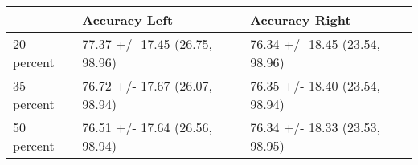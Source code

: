 \begin{tabular}{lll}
\toprule
{} &                   Accuracy Left &                  Accuracy Right \\
\midrule
20 percent &  77.37 +/- 17.45 (26.75, 98.96) &  76.34 +/- 18.45 (23.54, 98.96) \\
35 percent &  76.72 +/- 17.67 (26.07, 98.94) &  76.35 +/- 18.40 (23.54, 98.94) \\
50 percent &  76.51 +/- 17.64 (26.56, 98.94) &  76.34 +/- 18.33 (23.53, 98.95) \\
\bottomrule
\end{tabular}
